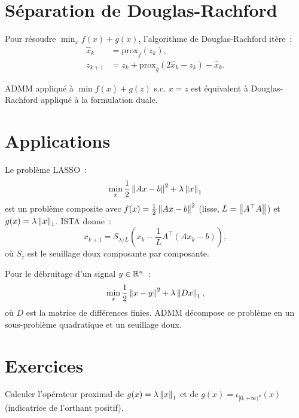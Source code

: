 \section{S\'eparation de Douglas-Rachford}

\begin{definition}
Pour r\'esoudre $\min_x f(x) + g(x)$, l'algorithme de Douglas-Rachford
it\`ere~:
\begin{align*}
  \hat{x}_{k} &= \mathrm{prox}_f(z_k), \\
  z_{k+1} &= z_k + \mathrm{prox}_g(2\hat{x}_k - z_k) - \hat{x}_k.
\end{align*}
\end{definition}

\begin{proposition}
ADMM appliqu\'e \`a $\min f(x) + g(z)$ s.c. $x = z$ est \'equivalent \`a
Douglas-Rachford appliqu\'e \`a la formulation duale.
\end{proposition}

\section{Applications}

\begin{exemple}
Le probl\`eme LASSO~:
\[
  \min_x \frac{1}{2} \left\| Ax - b \right\|^2 + \lambda \left\| x \right\|_1
\]
est un probl\`eme composite avec $f(x) = \frac{1}{2}\left\| Ax-b \right\|^2$ (lisse,
$L = \left\| A^\top A \right\|$) et $g(x) = \lambda \left\| x \right\|_1$. ISTA donne~:
\[
  x_{k+1} = S_{\lambda/L}\!\left(x_k - \frac{1}{L} A^\top(Ax_k - b)\right),
\]
o\`u $S_\tau$ est le seuillage doux composante par composante.
\end{exemple}

\begin{exemple}
Pour le d\'ebruitage d'un signal $y \in \mathbb{R}^n$~:
\[
  \min_x \frac{1}{2}\left\| x - y \right\|^2 + \lambda \left\| Dx \right\|_1,
\]
o\`u $D$ est la matrice de diff\'erences finies. ADMM d\'ecompose ce
probl\`eme en un sous-probl\`eme quadratique et un seuillage doux.
\end{exemple}

\section{Exercices}

\begin{exercice}
Calculer l'op\'erateur proximal de $g(x) = \lambda \left\| x \right\|_1$ et de
$g(x) = \iota_{[0,+\infty)^n}(x)$ (indicatrice de l'orthant positif).
\end{exercice}

